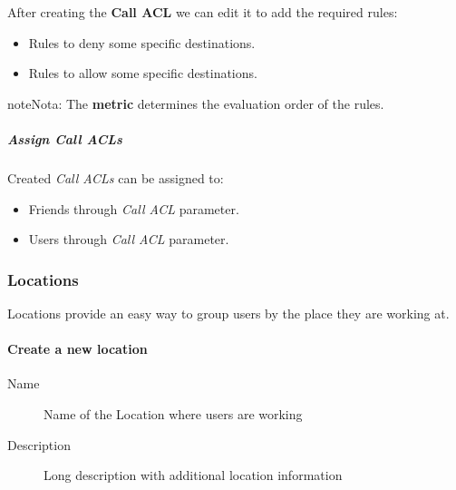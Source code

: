 \documentclass[letterpaper,10pt,spanish]{sphinxmanual}
\begin{document}
After creating the \textbf{Call ACL} we can edit it to add the required rules:
\begin{itemize}
\item {} 
Rules to deny some specific destinations.

\item {} 
Rules to allow some specific destinations.

\end{itemize}

\begin{notice}{note}{Nota:}
The \textbf{metric} determines the evaluation order of the rules.
\end{notice}


\subparagraph{Assign Call ACLs}
\label{administration_portal/client/vpbx/user_configuration/call_acls:assign-call-acls}
Created \emph{Call ACLs} can be assigned to:
\begin{itemize}
\item {} 
Friends through \emph{Call ACL} parameter.

\item {} 
Users through \emph{Call ACL} parameter.

\end{itemize}


\subsubsection{Locations}
\label{administration_portal/client/vpbx/user_configuration/locations::doc}\label{administration_portal/client/vpbx/user_configuration/locations:locations}
Locations provide an easy way to group users by the place they are working at.
\paragraph{Create a new location}
\begin{description}
\item[{Name}] \leavevmode{}\label{administration_portal/client/vpbx/user_configuration/locations:term-name}
Name of the Location where users are working

\item[{Description}] \leavevmode{}\label{administration_portal/client/vpbx/user_configuration/locations:term-description}
Long description with additional location information

\end{description}
\end{document}
